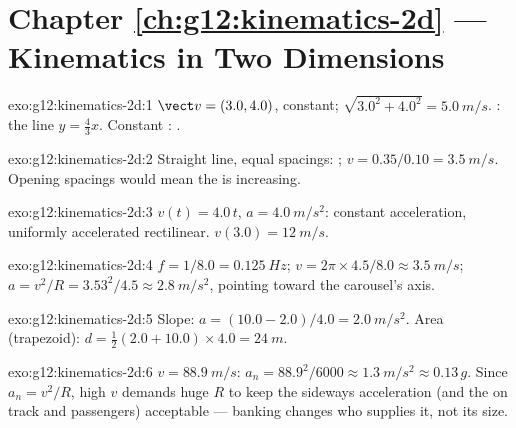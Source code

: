 \section*{Chapter \ref{ch:g12:kinematics-2d} --- Kinematics in Two Dimensions}

\begin{solution}{exo:g12:kinematics-2d:1}
$\vect v = (3.0, 4.0)$, constant;  $\sqrt{3.0^2 + 4.0^2} =
\qty{5.0}{m/s}$. : the line $y = \tfrac43 x$. Constant
: .
\end{solution}

\begin{solution}{exo:g12:kinematics-2d:2}
Straight line, equal spacings: ;
$v = 0.35/0.10 = \qty{3.5}{m/s}$. Opening spacings would mean the
 is increasing.
\end{solution}

\begin{solution}{exo:g12:kinematics-2d:3}
$v(t) = 4.0\,t$, $a = \qty{4.0}{m/s^2}$: constant acceleration,
uniformly accelerated rectilinear. $v(3.0) = \qty{12}{m/s}$.
\end{solution}

\begin{solution}{exo:g12:kinematics-2d:4}
$f = 1/8.0 = \qty{0.125}{Hz}$;
$v = 2\pi \times 4.5/8.0 \approx \qty{3.5}{m/s}$;
$a = v^2/R = 3.53^2/4.5 \approx \qty{2.8}{m/s^2}$, pointing toward
the carousel's axis.
\end{solution}

\begin{solution}{exo:g12:kinematics-2d:5}
Slope: $a = (10.0 - 2.0)/4.0 = \qty{2.0}{m/s^2}$. Area (trapezoid):
$d = \tfrac12 (2.0 + 10.0) \times 4.0 = \qty{24}{m}$.
\end{solution}

\begin{solution}{exo:g12:kinematics-2d:6}
$v = \qty{88.9}{m/s}$: $a_n = 88.9^2/6000 \approx \qty{1.3}{m/s^2}
\approx 0.13\,g$. Since $a_n = v^2/R$, high $v$ demands huge $R$ to
keep the sideways acceleration (and the  on track and
passengers) acceptable --- banking changes who supplies it, not its
size.
\end{solution}

